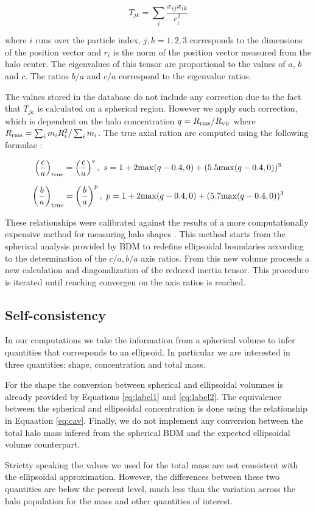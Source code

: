 \begin{equation}
T_{jk}  = \sum_{i}\frac{x_{ij}x_{ik}}{r_i^2}
\end{equation}

where $i$ runs over the particle index, $j,k=1,2,3$ corresponds to
the dimensions of the position vector and $r_i$ is the norm of the
position vector measured from the halo center. The eigenvalues of this
tensor are proportional to the values of $a$, $b$ and $c$. The ratios
$b/a$ and $c/a$ correspond to the eigenvalue ratios.

The values stored in the database do not include any correction due to
the fact that $T_{jk}$ is calculated on a spherical region. However we
apply such correction, which is dependent on the halo concentration
$q=R_{\rm rms}/R_{\rm vir}$ where $R_{\rm rms}=\sum_i m_iR_i^2/\sum_i
  m_i$. The true axial ration are computed using the following
  formulae \citep{Riebe:2011gp}:

\begin{equation}
\left(\frac{c}{a}\right)_{\rm true}  =
\left(\frac{c}{a}\right)^s,\ s=1 + 2{\rm max}(q - 0.4,0) +(5.5{\rm max}(q-0.4,0))^3
\label{eq:shape1}
\end{equation} 

\begin{equation}
\left(\frac{b}{a}\right)_{\rm true}  =
\left(\frac{b}{a}\right)^p,\ p=1 + 2{\rm max}(q - 0.4,0) +(5.7{\rm
  max}(q-0.4,0))^3
\label{eq:shape2}
\end{equation} 

These relationships were calibrated against the results of a more
computationally expensive method for  measuring halo shapes
\citep{Allgood2006}. This method starts from the spherical analysis
provided by BDM to redefine ellipsoidal boundaries according to the
determination of the $c/a,b/a$ axis ratios. From this new volume
proceeds a new calculation and diagonalization of the reduced inertia
tensor. This procedure is iterated until reaching convergen on the
axis ratios is reached. 


\subsection{Self-consistency}

In our computations we take the information from a spherical volume to
infer quantities that corresponds to an ellipsoid. In particular we
are interested in three quantities: shape, concentration and total
mass.

For the shape the conversion between spherical and
ellipsoidal volumnes is already provided by Equations \ref{eq:label1} and
\ref{eq:label2}. The equivalence between the spherical and ellipsoidal
concentration is done using the relationship in Equaation
\ref{eq:cav}. Finally, we do not implement any conversion between the
total halo mass infered from the spherical BDM and the expected
ellipsoidal volume counterpart. 

Strictty speaking the values we used for the total mass are not
consistent with the ellipsoidal approximation. However, the
differences between these two quantities are below the percent level,
much less than the variation across the halo population for the mass
and other quantities of interest. 

